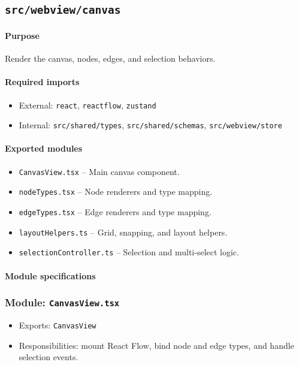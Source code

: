 \documentclass[11pt]{article}
\begin{document}
\subsection{\texttt{src/webview/canvas}}
\paragraph{Purpose} Render the canvas, nodes, edges, and selection behaviors.

\paragraph{Required imports}
\begin{itemize}[noitemsep]
  \item External: \texttt{react}, \texttt{reactflow}, \texttt{zustand}
  \item Internal: \texttt{src/shared/types}, \texttt{src/shared/schemas}, \texttt{src/webview/store}
\end{itemize}

\paragraph{Exported modules}
\begin{itemize}[noitemsep]
  \item \texttt{CanvasView.tsx} -- Main canvas component.
  \item \texttt{nodeTypes.tsx} -- Node renderers and type mapping.
  \item \texttt{edgeTypes.tsx} -- Edge renderers and type mapping.
  \item \texttt{layoutHelpers.ts} -- Grid, snapping, and layout helpers.
  \item \texttt{selectionController.ts} -- Selection and multi-select logic.
\end{itemize}

\paragraph{Module specifications}
\subsubsection*{Module: \texttt{CanvasView.tsx}}
\begin{itemize}[noitemsep]
  \item Exports: \texttt{CanvasView}
  \item Responsibilities: mount React Flow, bind node and edge types, and handle selection events.
\end{itemize}
\end{document}
